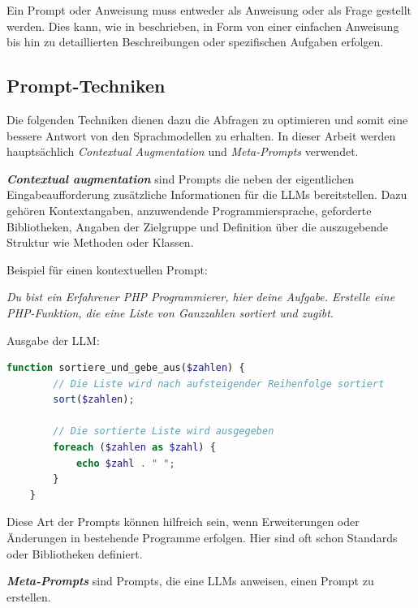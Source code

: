 Ein Prompt oder Anweisung muss entweder als Anweisung oder als Frage gestellt werden. Dies kann, wie in \cite{amatriain-2024} beschrieben, in Form von einer einfachen Anweisung bis hin zu detaillierten Beschreibungen oder spezifischen Aufgaben erfolgen.


\subsection{Prompt-Techniken}\label{subsec:prompt_technics}
Die folgenden Techniken dienen dazu die Abfragen zu optimieren und somit eine bessere Antwort von den Sprachmodellen zu erhalten. In dieser Arbeit werden hauptsächlich \textit{Contextual Augmentation} und \textit{Meta-Prompts} verwendet.\vspace{0.2cm}

\textbf{\textit{Contextual augmentation}} sind Prompts die neben der eigentlichen Eingabeaufforderung zusätzliche Informationen für die LLMs bereitstellen. Dazu gehören Kontextangaben, anzuwendende Programmiersprache, geforderte Bibliotheken, Angaben der Zielgruppe und Definition über die auszugebende Struktur wie Methoden oder Klassen.\vspace{0.2cm}

Beispiel für einen kontextuellen Prompt:

\textit{Du bist ein Erfahrener PHP Programmierer, hier deine Aufgabe. Erstelle eine PHP-Funktion, die eine Liste von Ganzzahlen sortiert und zugibt.}\vspace{0.2cm}

Ausgabe der LLM:

\begin{lstlisting}[language=PHP]
	function sortiere_und_gebe_aus($zahlen) {
		// Die Liste wird nach aufsteigender Reihenfolge sortiert
		sort($zahlen);
		
		// Die sortierte Liste wird ausgegeben
		foreach ($zahlen as $zahl) {
			echo $zahl . " ";
		}
	}
\end{lstlisting}

Diese Art der Prompts können hilfreich sein, wenn Erweiterungen oder Änderungen in bestehende Programme erfolgen. Hier sind oft schon Standards oder Bibliotheken definiert.\vspace{0.2cm}

\textbf{\textit{Meta-Prompts}} sind Prompts, die eine LLMs anweisen, einen Prompt zu erstellen.\vspace{0.2cm}


